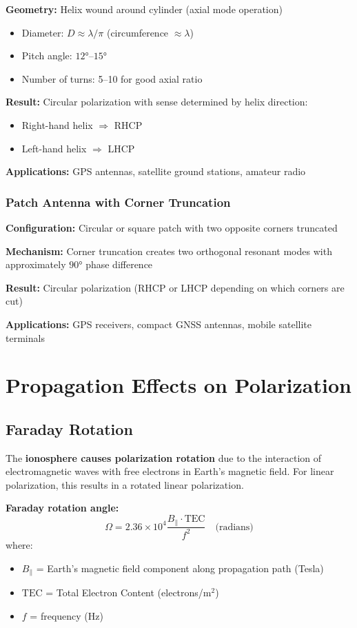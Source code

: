 \begin{center}
\textbf{Geometry:} Helix wound around cylinder (axial mode operation)
\begin{itemize}
\item Diameter: $D \approx \lambda/\pi$ (circumference $\approx \lambda$)
\item Pitch angle: $12°$--$15°$
\item Number of turns: 5--10 for good axial ratio
\end{itemize}

\textbf{Result:} Circular polarization with sense determined by helix direction:
\begin{itemize}
\item Right-hand helix $\Rightarrow$ RHCP
\item Left-hand helix $\Rightarrow$ LHCP
\end{itemize}

\textbf{Applications:} GPS antennas, satellite ground stations, amateur radio

\subsubsection{Patch Antenna with Corner Truncation}

\textbf{Configuration:} Circular or square patch with two opposite corners truncated

\textbf{Mechanism:} Corner truncation creates two orthogonal resonant modes with approximately $90°$ phase difference

\textbf{Result:} Circular polarization (RHCP or LHCP depending on which corners are cut)

\textbf{Applications:} GPS receivers, compact GNSS antennas, mobile satellite terminals

\section{Propagation Effects on Polarization}

\subsection{Faraday Rotation}

The \textbf{ionosphere causes polarization rotation} due to the interaction of electromagnetic waves with free electrons in Earth's magnetic field. For linear polarization, this results in a rotated linear polarization.

\textbf{Faraday rotation angle:}
\begin{equation}
\Omega = 2.36 \times 10^4 \frac{B_\parallel \cdot \mathrm{TEC}}{f^2} \quad \text{(radians)}
\label{eq:faraday-rotation}
\end{equation}
where:
\begin{itemize}
\item $B_\parallel$ = Earth's magnetic field component along propagation path (Tesla)
\item $\mathrm{TEC}$ = Total Electron Content (electrons/m$^2$)
\item $f$ = frequency (Hz)
\end{itemize}


\end{center}
